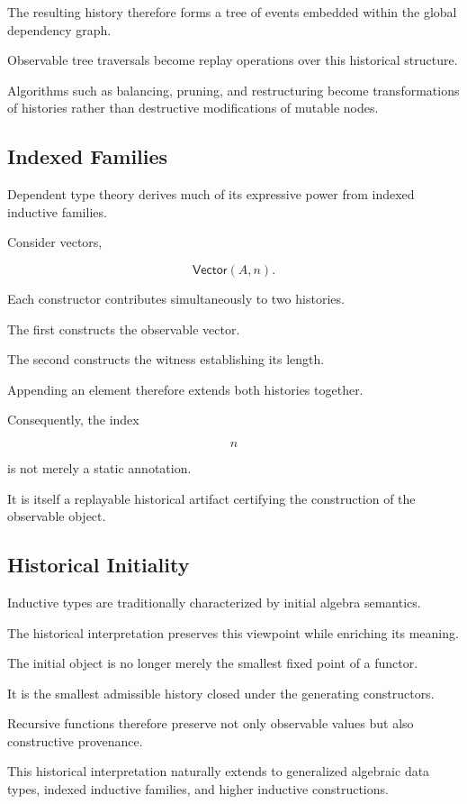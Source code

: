 \documentclass[12pt,oneside]{article}
\theoremstyle{definition}
\theoremstyle{remark}
\begin{document}
The resulting history therefore forms a tree of events embedded within the
global dependency graph.

Observable tree traversals become replay operations over this historical
structure.

Algorithms such as balancing, pruning, and restructuring become transformations
of histories rather than destructive modifications of mutable nodes.

\subsection{Indexed Families}

Dependent type theory derives much of its expressive power from indexed
inductive families.

Consider vectors,

\[
\mathsf{Vector}(A,n).
\]

Each constructor contributes simultaneously to two histories.

The first constructs the observable vector.

The second constructs the witness establishing its length.

Appending an element therefore extends both histories together.

Consequently, the index

\[
n
\]

is not merely a static annotation.

It is itself a replayable historical artifact certifying the construction of the
observable object.

\subsection{Historical Initiality}

Inductive types are traditionally characterized by initial algebra semantics.

The historical interpretation preserves this viewpoint while enriching its
meaning.

The initial object is no longer merely the smallest fixed point of a functor.

It is the smallest admissible history closed under the generating constructors.

Recursive functions therefore preserve not only observable values but also
constructive provenance.

This historical interpretation naturally extends to generalized algebraic data
types, indexed inductive families, and higher inductive constructions.
\end{document}
